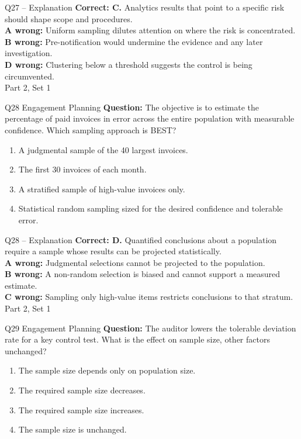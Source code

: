 \documentclass[aspectratio=169,10pt]{beamer}
\begin{document}
\begin{frame}[t]{Q27 -- Explanation}
	\footnotesize
	\textbf{Correct: C.} Analytics results that point to a specific risk should shape scope and procedures. \\[5pt]
\textbf{A wrong:} Uniform sampling dilutes attention on where the risk is concentrated. \\[3pt]
\textbf{B wrong:} Pre-notification would undermine the evidence and any later investigation. \\[3pt]
\textbf{D wrong:} Clustering below a threshold suggests the control is being circumvented. \\[3pt]
	\vfill {\tiny Part 2, Set 1}
\end{frame}
\begin{frame}[t]{Q28 \hfill {\scriptsize Engagement Planning}}
	\small
	\textbf{Question:} The objective is to estimate the percentage of paid invoices in error across the entire population with measurable confidence. Which sampling approach is BEST?
	\begin{enumerate}[label=\Alph*.,itemsep=1pt,topsep=3pt]
			\item A judgmental sample of the 40 largest invoices.
			\item The first 30 invoices of each month.
			\item A stratified sample of high-value invoices only.
			\item Statistical random sampling sized for the desired confidence and tolerable error.
	\end{enumerate}
\end{frame}
\begin{frame}[t]{Q28 -- Explanation}
	\footnotesize
	\textbf{Correct: D.} Quantified conclusions about a population require a sample whose results can be projected statistically. \\[5pt]
\textbf{A wrong:} Judgmental selections cannot be projected to the population. \\[3pt]
\textbf{B wrong:} A non-random selection is biased and cannot support a measured estimate. \\[3pt]
\textbf{C wrong:} Sampling only high-value items restricts conclusions to that stratum. \\[3pt]
	\vfill {\tiny Part 2, Set 1}
\end{frame}
\begin{frame}[t]{Q29 \hfill {\scriptsize Engagement Planning}}
	\small
	\textbf{Question:} The auditor lowers the tolerable deviation rate for a key control test. What is the effect on sample size, other factors unchanged?
	\begin{enumerate}[label=\Alph*.,itemsep=1pt,topsep=3pt]
			\item The sample size depends only on population size.
			\item The required sample size decreases.
			\item The required sample size increases.
			\item The sample size is unchanged.
	\end{enumerate}
\end{frame}
\end{document}
